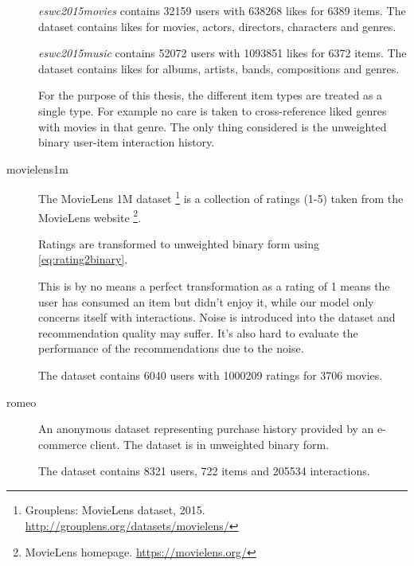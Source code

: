 \begin{description}
        \textit{eswc2015movies} contains 32159 users with 638268 likes for 6389 items. The dataset contains likes for movies, actors, directors, characters and genres.

        \textit{eswc2015music} contains 52072 users with 1093851 likes for 6372 items. The dataset contains likes for albums, artists, bands, compositions and genres.

        For the purpose of this thesis, the different item types are treated as a single type. For example no care is taken to cross-reference liked genres with movies in that genre. The only thing considered is the unweighted binary user-item interaction history.





    \item[movielens1m] \hfill

        The MovieLens 1M dataset \footnote{Grouplens: MovieLens dataset, 2015. \url{http://grouplens.org/datasets/movielens/}} is a collection of ratings (1-5) taken from the MovieLens website \footnote{MovieLens homepage. \url{https://movielens.org/}}.

        Ratings are transformed to unweighted binary form using \eqref{eq:rating2binary}.

        This is by no means a perfect transformation as a rating of 1 means the user has consumed an item but didn't enjoy it, while our model only concerns itself with interactions. Noise is introduced into the dataset and recommendation quality may suffer. It's also hard to evaluate the performance of the recommendations due to the noise.

        The dataset contains 6040 users with 1000209 ratings for 3706 movies.



    \item[romeo] \hfill

        An anonymous dataset representing purchase history provided by an e-commerce client. The dataset is in unweighted binary form.

        The dataset contains 8321 users, 722 items and 205534 interactions.



\end{description}

